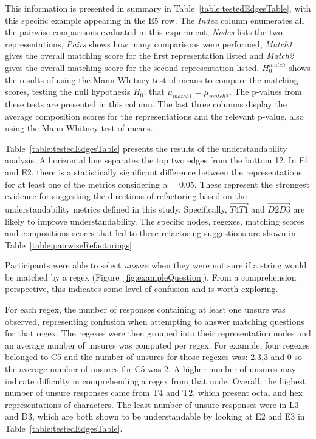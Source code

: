 This information is presented in summary in Table~\ref{table:testedEdgesTable}, with this specific example appearing in the E5 row. The \emph{Index} column enumerates all the pairwise comparisons evaluated in this experiment, \emph{Nodes} lists the two representations, \emph{Pairs} shows how many comparisons were performed, \emph{Match1} gives the overall matching score for the first representation listed and \emph{Match2} gives the overall matching score for the second representation listed. $H_0^{match}$ shows the results of using the Mann-Whitney test of means to compare the matching scores, testing the null hypothesis $H_0$: that $\mu_{match1} = \mu_{match2}$.  The p-values from these tests are presented in this column. The last three columns display the average composition scores for the representations and the relevant p-value, also using the Mann-Whitney test of means.



Table~\ref{table:testedEdgesTable} presents the results of the understandability analysis. A horizontal line separates the top two edges from the bottom 12. In E1 and E2, there is a statistically significant difference between the representations for at least one of the metrics considering $\alpha = 0.05$.  These represent the strongest evidence for suggesting the directions of refactoring based on the understandability metrics defined in this study. Specifically, $\overrightarrow{T4 T1}$ and $\overrightarrow{D2 D3}$ are likely to improve understandability.  The specific nodes, regexes, matching scores and compositions scores that led to these refactoring suggestions are shown in Table~\ref{table:pairwiseRefactorings}

Participants were able to select \emph{unsure} when they were not sure if a string would be matched by a regex (Figure~\ref{fig:exampleQuestion}). From a comprehension perspective, this indicates some level of confusion and is worth exploring.



For each regex, the number of responses containing at least one unsure was observed, representing confusion when attempting to answer matching questions for that regex.
The regexes were then grouped into their representation nodes and an average number of unsures was computed per regex.  For example, four regexes belonged to C5 and the number of unsures for those regexes was: 2,3,3 and 0 so the average number of unsures for C5 was 2.
A higher number of unsures may indicate difficulty in comprehending a regex from that node.
Overall, the highest number of unsure responses came from T4 and T2, which present octal and hex representations of characters. The least number of unsure responses were in L3 and D3, which are both shown to be understandable by looking at E2 and E3 in Table~\ref{table:testedEdgesTable}.

